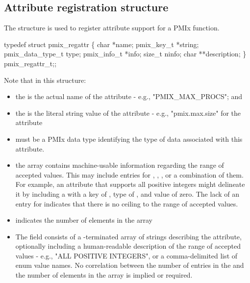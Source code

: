 \subsection{Attribute registration structure}

The  structure is used to register attribute support for a \ac{PMIx} function.

\cspecificstart
\begin{codepar}
typedef struct pmix_regattr \{
    char *name;
    pmix_key_t *string;
    pmix_data_type_t type;
    pmix_info_t *info;
    size_t ninfo;
    char **description;
\} pmix_regattr_t;;
\end{codepar}
\cspecificend

Note that in this structure:

\begin{itemize}
    \item the  is the actual name of the attribute - e.g., "PMIX_MAX_PROCS"; and
    \item the  is the literal string value of the attribute - e.g., "pmix.max.size" for the  attribute
    \item {} must be a \ac{PMIx} data type identifying the type of data associated with this attribute.
    \item the  array contains machine-usable information regarding the range of accepted values. This may include entries for , , , or a combination of them. For example, an attribute that supports all positive integers might delineate it by including a  with a key of , type of , and value of zero. The lack of an entry for  indicates that there is no ceiling to the range of accepted values.
    \item {} indicates the number of elements in the  array
    \item The  field consists of a -terminated array of strings describing the attribute, optionally including a human-readable description of the range of accepted values - e.g., "ALL POSITIVE INTEGERS", or a comma-delimited list of enum value names. No correlation between the number of entries in the  and the number of elements in the  array is implied or required.
\end{itemize}

